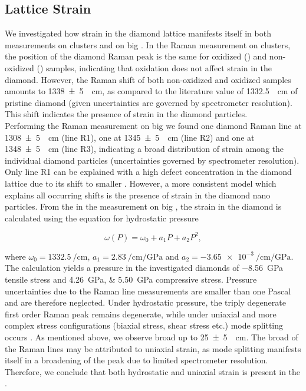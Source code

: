 			\subsection{Lattice Strain}\label{subsection::raman_strain}

				We investigated how strain in the diamond lattice manifests itself in both measurements on \nd clusters and on big \nds.
				In the Raman measurement on \nd clusters, the position of the diamond Raman peak is the same for oxidized (\insituSo) and non-oxidized (\insituSn) samples, indicating that oxidation does not affect strain in the diamond.
				However, the Raman shift of both non-oxidized and oxidized samples amounts to \SI[separate-uncertainty]{1338+-5}{\per\centi\meter}, as compared to the literature value of \SI{1332.5}{\per\centi\meter} of pristine diamond \cite{Zaitsev2001} (given uncertainties are governed by spectrometer resolution).
				This shift indicates the presence of strain in the diamond particles.
				\\
				Performing the Raman measurement on big \nds we found one diamond Raman line at \SI[separate-uncertainty]{1308+-5}{\per\centi\meter} (line R1), one at \SI[separate-uncertainty]{1345+-5}{\per\centi\meter} (line R2) and one at \SI[separate-uncertainty]{1348+-5}{\per\centi\meter} (line R3), indicating a broad distribution of strain among the individual diamond particles (uncertainties governed by spectrometer resolution).
				Only line R1 can be explained with a high defect concentration in the diamond lattice due to its shift to smaller \wl.
				However, a more consistent model which explains all occurring shifts is the presence of strain in the diamond nano particles.
				From the \lws in the measurement on big \nds, the strain in the diamond is calculated using the equation for hydrostatic pressure \cite{Prawer2004}

				\begin{equation}
					\omega(P)=\omega_0+a_1P+a_2P^2,
				\end{equation}
				
				where $\omega_0=\SI{1332.5}{\per\centi\meter}$, $a_1=\SI{2.83}{\per\centi\meter\per\giga\pascal}$ and $a_2=\SI{-3.65e-3}{\per\centi\meter\per\giga\pascal}$.
				The calculation yields a pressure in the investigated diamonds of \SI{-8.56}{\giga\pascal} tensile stress and \SIlist{4.26;5.50}{\giga\pascal} compressive stress.
				Pressure uncertainties due to the Raman line measurements are smaller than one Pascal and are therefore neglected.
				Under hydrostatic pressure, the triply degenerate first order Raman peak remains degenerate, while under uniaxial and more complex stress configurations (biaxial stress, shear stress etc.) mode splitting occurs \cite{Prawer2004}.
				As mentioned above, we observe broad \lws up to \SI[separate-uncertainty]{25+-5}{\per\centi\meter}.
				The broad \lws of the Raman lines may be attributed to uniaxial strain, as mode splitting manifests itself in a broadening of the peak due to limited spectrometer resolution.
				Therefore, we conclude that both hydrostatic and uniaxial strain is present in the \nds.

